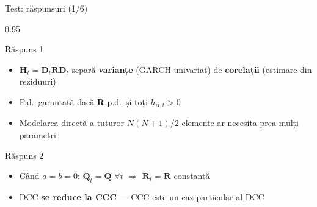 \documentclass[9pt, aspectratio=169, t]{beamer}
\begin{document}
\begin{frame}{Test: răspunsuri (1/6)}
    \begin{cminipage}{0.95\textwidth}
    {\footnotesize
    \begin{exampleblock}{Răspuns 1}
        \begin{itemize}\setlength{\itemsep}{0pt}
            \item $\mathbf{H}_t = \mathbf{D}_t\mathbf{R}\mathbf{D}_t$ separă \textbf{varianțe} (GARCH univariat) de \textbf{corelații} (estimare din reziduuri)
            \item P.d.\ garantată dacă $\mathbf{R}$ p.d.\ și toți $h_{ii,t} > 0$
            \item Modelarea directă a tuturor $N(N+1)/2$ elemente ar necesita prea mulți parametri
        \end{itemize}
    \end{exampleblock}
    \begin{exampleblock}{Răspuns 2}
        \begin{itemize}\setlength{\itemsep}{0pt}
            \item Când $a = b = 0$: $\mathbf{Q}_t = \bar{\mathbf{Q}}$ $\forall t$ $\Rightarrow$ $\mathbf{R}_t = \bar{\mathbf{R}}$ constantă
            \item DCC \textbf{se reduce la CCC} --- CCC este un caz particular al DCC
        \end{itemize}
    \end{exampleblock}
    }
    \end{cminipage}
\end{frame}
\end{document}
